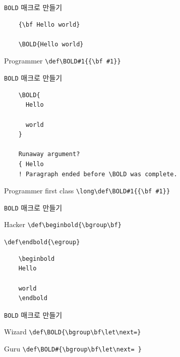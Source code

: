 \documentclass{beamer}
\begin{document}
%
\begin{frame}[fragile]{\texttt{BOLD} 매크로 만들기}
  \begin{verbatim}
    {\bf Hello world}
    
    \BOLD{Hello world}
  \end{verbatim}
  \begin{alertblock}{Programmer}
    \verb+\def\BOLD#1{{\bf #1}}+
  \end{alertblock}
\end{frame}


%
\begin{frame}[fragile]{\texttt{BOLD} 매크로 만들기}
  \begin{verbatim}
    \BOLD{
      Hello

      world
    }

    Runaway argument?
    { Hello
    ! Paragraph ended before \BOLD was complete.
  \end{verbatim}
  \begin{alertblock}{Programmer first class}
    \verb+\long\def\BOLD#1{{\bf #1}}+
  \end{alertblock}
\end{frame}


%
\begin{frame}[fragile]{\texttt{BOLD} 매크로 만들기}
  \begin{alertblock}{Hacker}
    \verb+\def\beginbold{\bgroup\bf}+
    
    \verb+\def\endbold{\egroup}+
  \end{alertblock}

  \begin{verbatim}
    \beginbold
    Hello

    world
    \endbold
  \end{verbatim}
\end{frame}


%
\begin{frame}[fragile]{\texttt{BOLD} 매크로 만들기}
  \begin{alertblock}{Wizard}
    \verb+\def\BOLD{\bgroup\bf\let\next=}+
  \end{alertblock}
  \medskip
  \begin{exampleblock}{Guru}
    \verb+\def\BOLD#{\bgroup\bf\let\next= }+
  \end{exampleblock}
\end{frame}
\end{document}
